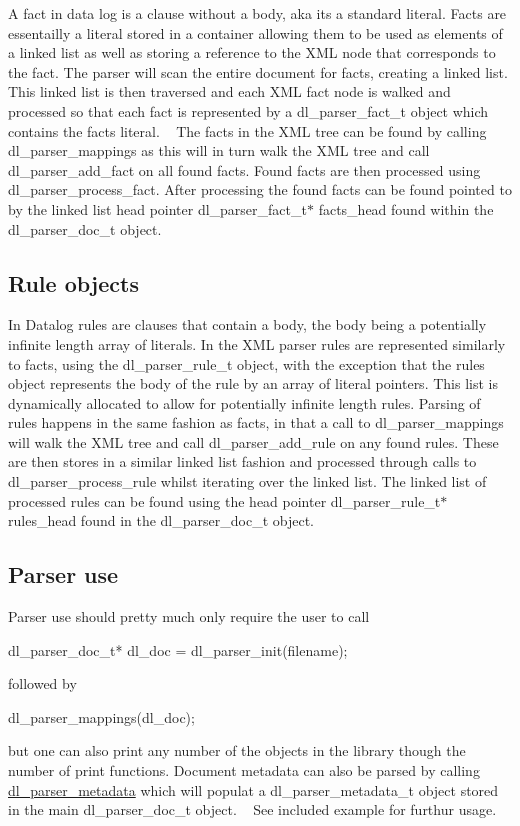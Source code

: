 A fact in data log is a clause without a body, aka it\textquotesingle{}s a standard literal. Facts are essentailly a literal stored in a container allowing them to be used as elements of a linked list as well as storing a reference to the X\+ML node that corresponds to the fact. The parser will scan the entire document for facts, creating a linked list. This linked list is then traversed and each X\+ML fact node is walked and processed so that each fact is represented by a dl\+\_\+parser\+\_\+fact\+\_\+t object which contains the fact\textquotesingle{}s literal. ~\newline
 The facts in the X\+ML tree can be found by calling dl\+\_\+parser\+\_\+mappings as this will in turn walk the X\+ML tree and call dl\+\_\+parser\+\_\+add\+\_\+fact on all found facts. Found facts are then processed using dl\+\_\+parser\+\_\+process\+\_\+fact. After processing the found facts can be found pointed to by the linked list head pointer dl\+\_\+parser\+\_\+fact\+\_\+t$\ast$ facts\+\_\+head found within the dl\+\_\+parser\+\_\+doc\+\_\+t object. \hypertarget{index_rule_sec}{}\subsection{Rule objects}\label{index_rule_sec}
In Datalog rules are clauses that contain a body, the body being a potentially infinite length array of literals. In the X\+ML parser rules are represented similarly to facts, using the dl\+\_\+parser\+\_\+rule\+\_\+t object, with the exception that the rules object represents the body of the rule by an array of literal pointers. This list is dynamically allocated to allow for potentially infinite length rules. Parsing of rules happens in the same fashion as facts, in that a call to dl\+\_\+parser\+\_\+mappings will walk the X\+ML tree and call dl\+\_\+parser\+\_\+add\+\_\+rule on any found rules. These are then stores in a similar linked list fashion and processed through calls to dl\+\_\+parser\+\_\+process\+\_\+rule whilst iterating over the linked list. The linked list of processed rules can be found using the head pointer dl\+\_\+parser\+\_\+rule\+\_\+t$\ast$ rules\+\_\+head found in the dl\+\_\+parser\+\_\+doc\+\_\+t object. \hypertarget{index_parse_use_sec}{}\subsection{Parser use}\label{index_parse_use_sec}
Parser use should pretty much only require the user to call \begin{DoxyVerb} dl_parser_doc_t* dl_doc = dl_parser_init(filename);\end{DoxyVerb}
 followed by \begin{DoxyVerb} dl_parser_mappings(dl_doc);\end{DoxyVerb}
 but one can also print any number of the objects in the library though the number of print functions. Document metadata can also be parsed by calling \hyperlink{structdl__parser__metadata}{dl\+\_\+parser\+\_\+metadata} which will populat a dl\+\_\+parser\+\_\+metadata\+\_\+t object stored in the main dl\+\_\+parser\+\_\+doc\+\_\+t object. ~\newline
 See included example for furthur usage. 